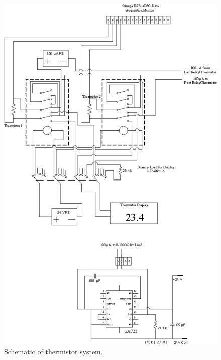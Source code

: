 \begin{figure}[!htbp]
 \centering
 \includegraphics[height=.9\textheight]{./img/subsystem-thermistor-schematic.png}
 \caption{Schematic of thermistor system.}
 \label{fig:subsystem-thermistor-schematic}
\end{figure}
